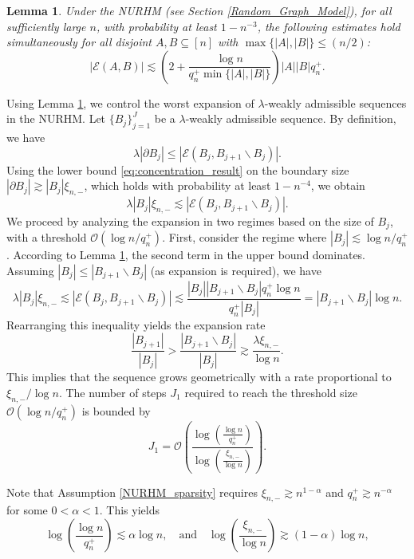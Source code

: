 \documentclass[
  12pt]{article}
\newtheorem{lemma}{Lemma}
\begin{document}
\begin{lemma}
\label{lemma_nurhm_concentration}
Under the NURHM (see Section \ref{Random_Graph_Model}), for all sufficiently large $n$, with probability at least $1-n^{-3}$, the following estimates hold simultaneously for all disjoint $A, B \subseteq [n]$ with $\max \{|A|,|B|\} \leq ({n}/{2})$:
$$
|\mathcal{E}(A, B)| \lesssim \left(2 + \frac{\log n}{q_{n}^{+} \min \{|A|,|B|\}}\right) |A||B| q_{n}^{+}.
$$
\end{lemma}

\noindent Using Lemma \ref{lemma_nurhm_concentration}, we control the worst expansion of $\lambda$-weakly admissible sequences in the NURHM. Let $\{B_j\}_{j=1}^J$ be a $\lambda$-weakly admissible sequence. By definition, we have
$$
\lambda |\partial B_j| \leq |\mathcal{E}(B_j, B_{j+1} \backslash B_j)|.
$$
Using the lower bound \eqref{eq:concentration_result} on the boundary size $|\partial B_j| \gtrsim |B_j| \xi_{n,-}$, which holds with probability at least $1-n^{-4}$, we obtain
$$
\lambda |B_j| \xi_{n,-} \lesssim |\mathcal{E}(B_j, B_{j+1} \backslash B_j)|.
$$
We proceed by analyzing the expansion in two regimes based on the size of $B_j$, with a threshold $\mathcal{O}(\log n/q_{n}^{+})$. First, consider the regime where $|B_j| \lesssim \log n/q_{n}^{+}$. According to Lemma \ref{lemma_nurhm_concentration}, the second term in the upper bound dominates. Assuming $|B_j| \leq |B_{j+1} \backslash B_j|$ (as expansion is required), we have
$$
\lambda |B_j| \xi_{n,-} \lesssim |\mathcal{E}(B_j, B_{j+1} \backslash B_j)| \lesssim \frac{|B_j||B_{j+1} \backslash B_j|q_{n}^{+} \log n}{q_{n}^{+} |B_j|} = |B_{j+1} \backslash B_j| \log n.
$$
Rearranging this inequality yields the expansion rate
$$
\frac{|B_{j+1}|}{|B_j|} > \frac{|B_{j+1} \backslash B_j|}{|B_j|} \gtrsim \frac{\lambda \xi_{n,-}}{\log n}.
$$
This implies that the sequence grows geometrically with a rate proportional to $\xi_{n,-} / \log n$. The number of steps $J_1$ required to reach the threshold size $\mathcal{O}(\log n/q_{n}^{+})$ is bounded by
$$J_1 = \mathcal{O} \left(\frac{\log \left(\frac{\log n}{q_{n}^{+}}\right)}{\log \left(\frac{\xi_{n,-}}{\log n}\right)}\right).$$

\noindent Note that Assumption \ref{NURHM_sparsity} requires $\xi_{n,-} \gtrsim n^{1-\alpha}$ and $q_{n}^{+} \gtrsim n^{-\alpha}$ for some $0 < \alpha < 1$. This yields 
\begin{equation}
    \log \left(\frac{\log n}{q_{n}^{+}}\right)\lesssim \alpha \log n,  \quad \text{and} \quad \log \left(\frac{\xi_{n,-}}{\log n}\right) \gtrsim (1-\alpha) \log n,
\end{equation}
\end{document}

